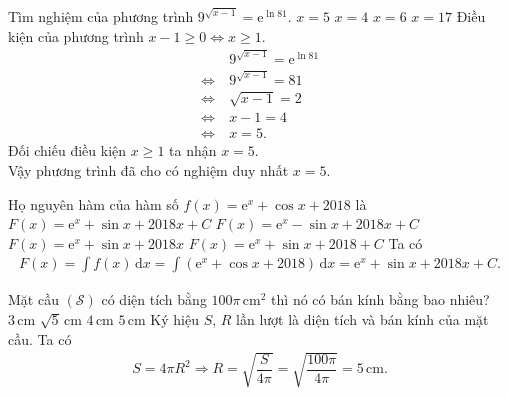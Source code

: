 \begin{ex}%
 Tìm nghiệm của phương trình $9^{\sqrt{x - 1}} = \mathrm{e}^{\ln 81}$.
 \choice
  {\True $x = 5$}
  {$x = 4$}
  {$x = 6$}
  {$x = 17$}
 \loigiai
  {
  Điều kiện của phương trình $x - 1 \geq 0 \Leftrightarrow x \geq 1$.
  \begin{align*}
   					 & 9^{\sqrt{x - 1}} = \mathrm{e}^{\ln 81} \\
   \Leftrightarrow \ & 9^{\sqrt{x - 1}} = 81 \\
   \Leftrightarrow \ & \sqrt{x - 1} = 2 \\
   \Leftrightarrow \ & x - 1 = 4 \\
   \Leftrightarrow \ & x = 5.
  \end{align*}
  Đối chiếu điều kiện $x \geq 1$ ta nhận $x = 5$.\\
  Vậy phương trình đã cho có nghiệm duy nhất $x = 5$.
  }
\end{ex}


\begin{ex}%
 Họ nguyên hàm của hàm số $f(x) = \mathrm{e}^x + \cos x + 2018$ là
 \choice
  {\True $F(x) = \mathrm{e}^x + \sin x + 2018x + C$}
  {$F(x) = \mathrm{e}^x - \sin x + 2018x + C$}
  {$F(x) = \mathrm{e}^x + \sin x + 2018x$}
  {$F(x) = \mathrm{e}^x + \sin x + 2018 + C$}
 \loigiai
  {
  Ta có 
  \begin{align*}
   F(x) = \displaystyle \int f(x) \mathrm{\,d}x = \displaystyle \int \left( \mathrm{e}^x + \cos x + 2018 \right) \mathrm{\,d}x = \mathrm{e}^x + \sin x + 2018x + C.
  \end{align*}
  }
\end{ex}


\begin{ex}%
 Mặt cầu $(\mathcal{S})$ có diện tích bằng $100 \pi \mathrm{\,cm}^2$ thì nó có bán kính bằng bao nhiêu?
 \choice
  {$3 \mathrm{\,cm}$}
  {$\sqrt{5} \mathrm{\,cm}$}
  {$4 \mathrm{\,cm}$}
  {\True $5 \mathrm{\,cm}$}
 \loigiai
  {
  Ký hiệu $S$, $R$ lần lượt là diện tích và bán kính của mặt cầu. Ta có
  \begin{align*}
   S = 4\pi R^2 \Rightarrow R = \sqrt{\dfrac{S}{4 \pi}} = \sqrt{\dfrac{100 \pi}{4 \pi}} = 5 \mathrm{\,cm}.
  \end{align*}
  }
\end{ex}


